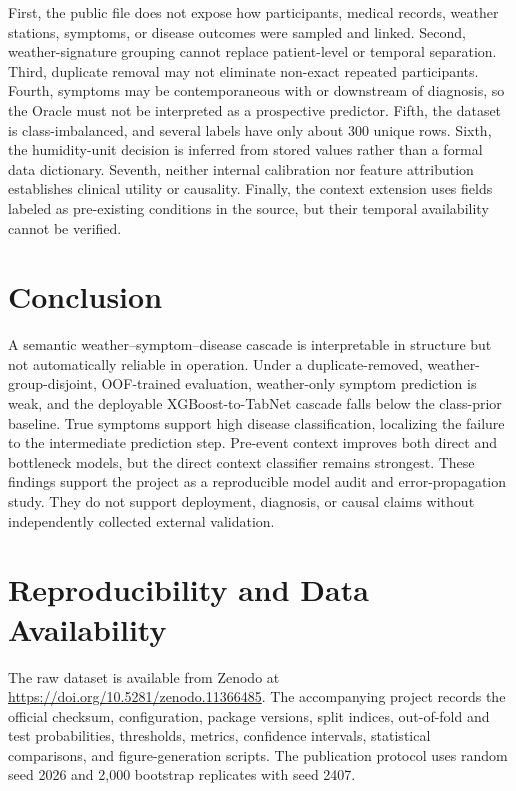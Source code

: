 \documentclass[conference]{IEEEtran}
\begin{document}
First, the public file does not expose how participants, medical records,
weather stations, symptoms, or disease outcomes were sampled and linked.
Second, weather-signature grouping cannot replace patient-level or temporal
separation. Third, duplicate removal may not eliminate non-exact repeated
participants. Fourth, symptoms may be contemporaneous with or downstream of
diagnosis, so the Oracle must not be interpreted as a prospective predictor.
Fifth, the dataset is class-imbalanced, and several labels have only about 300
unique rows. Sixth, the humidity-unit decision is inferred from stored values
rather than a formal data dictionary. Seventh, neither internal calibration
nor feature attribution establishes clinical utility or causality. Finally,
the context extension uses fields labeled as pre-existing conditions in the
source, but their temporal availability cannot be verified.

\section{Conclusion}

A semantic weather--symptom--disease cascade is interpretable in structure but
not automatically reliable in operation. Under a duplicate-removed,
weather-group-disjoint, OOF-trained evaluation, weather-only symptom prediction
is weak, and the deployable XGBoost-to-TabNet cascade falls below the class-prior
baseline. True symptoms support high disease classification, localizing the
failure to the intermediate prediction step. Pre-event context improves both
direct and bottleneck models, but the direct context classifier remains
strongest. These findings support the project as a reproducible model audit
and error-propagation study. They do not support deployment, diagnosis, or
causal claims without independently collected external validation.

\section*{Reproducibility and Data Availability}

The raw dataset is available from Zenodo at
\url{https://doi.org/10.5281/zenodo.11366485}. The accompanying project records
the official checksum, configuration, package versions, split indices,
out-of-fold and test probabilities, thresholds, metrics, confidence intervals,
statistical comparisons, and figure-generation scripts. The publication
protocol uses random seed 2026 and 2,000 bootstrap replicates with seed 2407.
\end{document}
